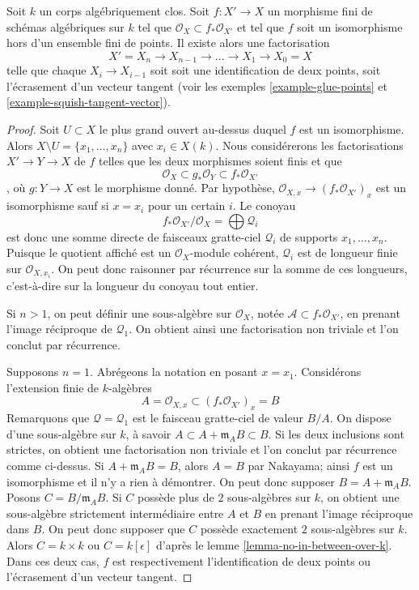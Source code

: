 \begin{lemma}
\label{lemma-factor-almost-isomorphism}
Soit $k$ un corps algébriquement clos. Soit $f : X' \to X$ un morphisme fini de schémas algébriques sur $k$ tel que $\mathcal{O}_X \subset f_*\mathcal{O}_{X'}$ et tel que $f$ soit un isomorphisme hors d'un ensemble fini de points. Il existe alors une factorisation $$
X' = X_n \to X_{n - 1} \to \ldots \to X_1 \to X_0 = X
$$ telle que chaque $X_i \to X_{i - 1}$ soit soit une identification de deux points, soit l'écrasement d'un vecteur tangent (voir les exemples \ref{example-glue-points} et \ref{example-squish-tangent-vector}).
\end{lemma}

\begin{proof}
Soit $U \subset X$ le plus grand ouvert au-dessus duquel $f$ est un isomorphisme. Alors $X \setminus U = \{x_1, \ldots, x_n\}$ avec $x_i \in X(k)$. Nous considérerons les factorisations $X' \to Y \to X$ de $f$ telles que les deux morphismes soient finis et que $$
\mathcal{O}_X \subset g_*\mathcal{O}_Y \subset f_*\mathcal{O}_{X'}
$$, où $g : Y \to X$ est le morphisme donné. Par hypothèse, $\mathcal{O}_{X, x} \to (f_*\mathcal{O}_{X'})_x$ est un isomorphisme sauf si $x = x_i$ pour un certain $i$. Le conoyau $$
f_*\mathcal{O}_{X'}/\mathcal{O}_X = \bigoplus \mathcal{Q}_i
$$ est donc une somme directe de faisceaux gratte-ciel $\mathcal{Q}_i$ de supports $x_1, \ldots, x_n$. Puisque le quotient affiché est un $\mathcal{O}_X$-module cohérent, $\mathcal{Q}_i$ est de longueur finie sur $\mathcal{O}_{X, x_i}$. On peut donc raisonner par récurrence sur la somme de ces longueurs, c'est-à-dire sur la longueur du conoyau tout entier.

\medskip\noindent
Si $n > 1$, on peut définir une sous-algèbre sur $\mathcal{O}_X$, notée $\mathcal{A} \subset f_*\mathcal{O}_{X'}$, en prenant l'image réciproque de $\mathcal{Q}_1$. On obtient ainsi une factorisation non triviale et l'on conclut par récurrence.

\medskip\noindent
Supposons $n = 1$. Abrégeons la notation en posant $x = x_1$. Considérons l'extension finie de $k$-algèbres $$
A = \mathcal{O}_{X, x} \subset (f_*\mathcal{O}_{X'})_x = B
$$ Remarquons que $\mathcal{Q} = \mathcal{Q}_1$ est le faisceau gratte-ciel de valeur $B/A$. On dispose d'une sous-algèbre sur $k$, à savoir $A \subset A + \mathfrak m_A B \subset B$. Si les deux inclusions sont strictes, on obtient une factorisation non triviale et l'on conclut par récurrence comme ci-dessus. Si $A + \mathfrak m_A B = B$, alors $A = B$ par Nakayama; ainsi $f$ est un isomorphisme et il n'y a rien à démontrer. On peut donc supposer $B = A + \mathfrak m_A B$. Posons $C = B/\mathfrak m_A B$. Si $C$ possède plus de $2$ sous-algèbres sur $k$, on obtient une sous-algèbre strictement intermédiaire entre $A$ et $B$ en prenant l'image réciproque dans $B$. On peut donc supposer que $C$ possède exactement $2$ sous-algèbres sur $k$. Alors $C = k \times k$ ou $C = k[\epsilon]$ d'après le lemme \ref{lemma-no-in-between-over-k}. Dans ces deux cas, $f$ est respectivement l'identification de deux points ou l'écrasement d'un vecteur tangent.
\end{proof}

